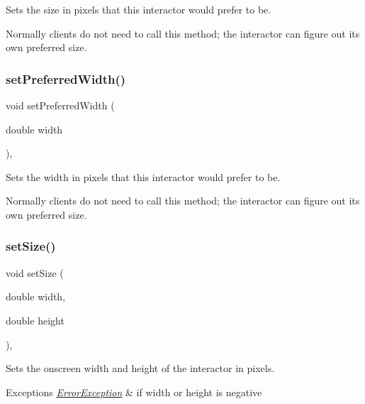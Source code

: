 Sets the size in pixels that this interactor would prefer to be. 

Normally clients do not need to call this method; the interactor can figure out its own preferred size. \mbox{\label{classGInteractor_a3db429ab2fa52efd187eec0ed8cdd9f2}} 
\subsubsection{\texorpdfstring{set\+Preferred\+Width()}{setPreferredWidth()}}
{\footnotesize\ttfamily void set\+Preferred\+Width (\begin{DoxyParamCaption}\item[{double}]{width }\end{DoxyParamCaption})\hspace{0.3cm}{\ttfamily [virtual]}, {\ttfamily [inherited]}}



Sets the width in pixels that this interactor would prefer to be. 

Normally clients do not need to call this method; the interactor can figure out its own preferred size. \mbox{\label{classGInteractor_aca25d49481f9bf5fc8f7df4c086c4ce7}} 
\subsubsection{\texorpdfstring{set\+Size()}{setSize()}\hspace{0.1cm}{\footnotesize\ttfamily [1/2]}}
{\footnotesize\ttfamily void set\+Size (\begin{DoxyParamCaption}\item[{double}]{width,  }\item[{double}]{height }\end{DoxyParamCaption})\hspace{0.3cm}{\ttfamily [virtual]}, {\ttfamily [inherited]}}



Sets the onscreen width and height of the interactor in pixels. 


\begin{DoxyExceptions}{Exceptions}
{\em \mbox{\hyperlink{classErrorException}{Error\+Exception}}} & if width or height is negative \\
\hline
\end{DoxyExceptions}


